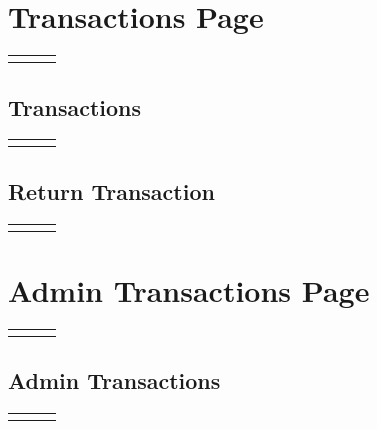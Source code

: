 \documentclass[12pt, letterpaper]{article}
\newcommand{\IPO}[3]{
  \begin{center}
    \begin{tabularx}{\linewidth}{XXX}
      \toprule
      \thead{Input} & \thead{Process} & \thead{Output} \\
      \midrule
      \RaggedRight{#1} & \RaggedRight{#2} & \RaggedRight{#3} \\
      \bottomrule
    \end{tabularx}
  \end{center}
}
\newcommand{\n}{\newline}
\begin{document}
\section{Transactions Page}

\IPO{``Transactions'' button}{Render navigation bar (\ref{navbar})\n Render transactions}{Transactions page}

\subsection{Transactions}

\IPO{\begin{itemize}\item User ID (\texttt{int})\item Filter by (\texttt{enum})\end{itemize}}{Query database for transactions linked to specified user ID and filter\n~\n Render ``filter by'' selection\n\textbf{IF} transactions is empty\n$\Rightarrow$Render ``empty'' \n\textbf{ELSE}\n$\Rightarrow$\textbf{FOR} each transaction\n$\Rightarrow\Rightarrow$Render item count, relative time, and type (``in''/``out'')\n$\Rightarrow\Rightarrow$On press, reveal quantity and title of each part\n$\Rightarrow\Rightarrow$\textbf{IF} type is ``out'' \n$\Rightarrow\Rightarrow\Rightarrow$Render ``return'' button in revealed portion (\ref{returntransaction})}{Transactions}

\subsection{Return Transaction}\label{returntransaction}

\IPO{\begin{itemize}\item Transaction (\texttt{object})\item ``Return'' button\end{itemize}}{\textbf{FOR} each part \& quantity in transaction\n$\Rightarrow$Increment part's stock in database by quantity\n~\n Update transaction's type to ``in''}{Transaction}

\section{Admin Transactions Page}

\IPO{(Admin)``Transactions'' button}{Render admin navigation bar (\ref{adminnavbar})\n Render admin transactions}{Admin transactions page}

\subsection{Admin Transactions}

\IPO{Filter by (\texttt{enum})}{Query database for all transactions and filter by specified filter\n~\n Render ``filter by'' selection\n\textbf{IF} transactions is empty\n$\Rightarrow$Render ``empty'' \n\textbf{ELSE}\n$\Rightarrow$\textbf{FOR} each transaction\n$\Rightarrow\Rightarrow$Render item count, relative time, type (``in''/``out''), and user's full name\n$\Rightarrow\Rightarrow$On press, reveal quantity and title of each part}{Admin transactions}
\end{document}
